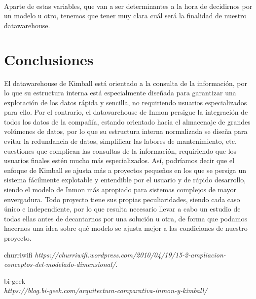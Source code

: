 \documentclass[11pt]{article}
\begin{document}
\\Aparte de estas variables, que van a ser determinantes a la hora de decidirnos por un modelo u otro, tenemos que tener muy clara cuál será la finalidad de nuestro datawarehouse.

\section*{Conclusiones}

El datawarehouse de Kimball está orientado a la consulta de la información, por lo que su estructura interna está especialmente diseñada para garantizar una explotación de los datos rápida y sencilla, no requiriendo usuarios especializados para ello. Por el contrario, el datawarehouse de Inmon persigue la integración de todos los datos de la compañía, estando orientado hacia el almacenaje de grandes volúmenes de datos, por lo que su estructura interna normalizada se diseña para evitar la redundancia de datos, simplificar las labores de mantenimiento, etc. cuestiones que complican las consultas de la información, requiriendo que los usuarios finales estén mucho más especializados.
Así, podríamos decir que el enfoque de Kimball se ajusta más a proyectos pequeños en los que se persiga un sistema fácilmente explotable y entendible por el usuario y de rápido desarrollo, siendo el modelo de Inmon más apropiado para sistemas complejos de mayor envergadura.
Todo proyecto tiene sus propias peculiaridades, siendo cada caso único e independiente, por lo que resulta necesario llevar a cabo un estudio de todas ellas antes de decantarnos por una solución u otra, de forma que podamos hacernos una idea sobre qué modelo se ajusta mejor a las condiciones de nuestro proyecto.

%
%


\begin{thebibliography}{9}
    churriwifi
    \textit{https://churriwifi.wordpress.com/2010/04/19/15-2-ampliacion-conceptos-del-modelado-dimensional/}. 
    

    bi-geek\\
    \textit{https://blog.bi-geek.com/arquitectura-comparativa-inmon-y-kimball/}
    
    
    
    


\end{thebibliography}
\end{document}
